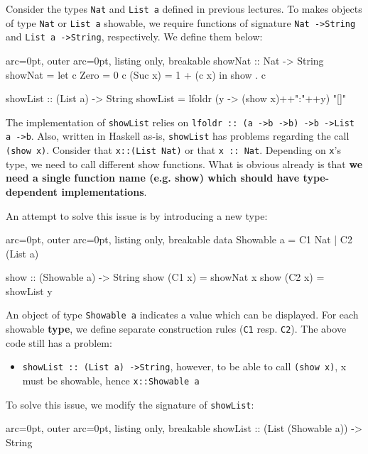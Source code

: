 Consider the types \texttt{Nat} and \texttt{List a} defined in previous lectures. To makes objects of type \texttt{Nat} or \texttt{List a} showable, we require functions of signature \texttt{Nat -\textgreater  String} and \texttt{List a -\textgreater  String}, respectively. We define them below:


\begin{tcblisting}{ arc=0pt, outer arc=0pt, listing only, breakable}
showNat :: Nat -> String
showNat =
	let c Zero = 0
	    c (Suc x) = 1 + (c x)
	    in show . c

showList :: (List a) -> String
showList = lfoldr (\x y -> (show x)++":"++y) "[]"

\end{tcblisting}


The implementation of \texttt{showList} relies on \texttt{lfoldr :: (a -\textgreater  b -\textgreater  b) -\textgreater  b -\textgreater  List a -\textgreater  b}. Also, written in Haskell as-is, \texttt{showList} has problems regarding the call \texttt{(show x)}. Consider that \texttt{x::(List Nat)} or that \texttt{x :: Nat}. Depending on \texttt{x}'s type, we need to call different show functions. What is obvious already is that \textbf{we need a single function name (e.g. show) which should have type-dependent implementations}.

An attempt to solve this issue is by introducing a new type:

\begin{tcblisting}{ arc=0pt, outer arc=0pt, listing only, breakable}
data Showable a = C1 Nat | C2 (List a)

show :: (Showable a) -> String
show (C1 x) = showNat x
show (C2 x) = showList y 

\end{tcblisting}
 

An object of type \texttt{Showable a} indicates a value which can be displayed. For each showable \textbf{type}, we define separate construction rules (\texttt{C1} resp. \texttt{C2}). The above code still has a problem:
\begin{itemize}
	\item  \texttt{showList :: (List a) -\textgreater  String}, however, to be able to call \texttt{(show x)}, x must be showable, hence \texttt{x::Showable a}
\end{itemize}

To solve this issue, we modify the signature of \texttt{showList}:

\begin{tcblisting}{ arc=0pt, outer arc=0pt, listing only, breakable}
showList :: (List (Showable a)) -> String

\end{tcblisting}


